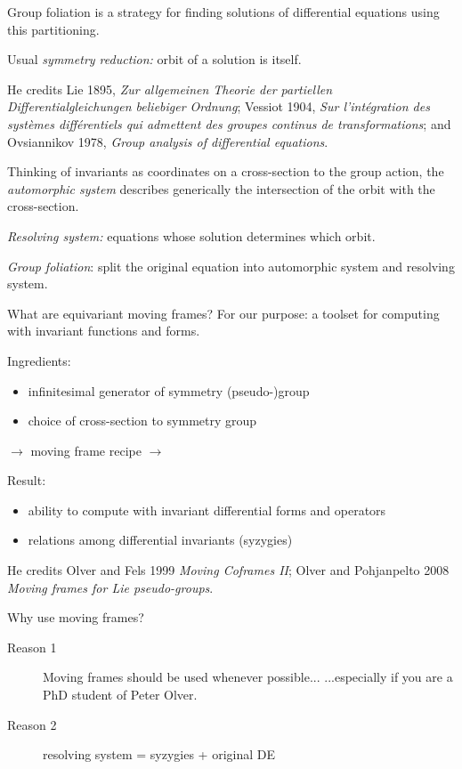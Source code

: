 \begin{description}
Group foliation is a strategy for finding solutions of differential
equations using this partitioning.

Usual \emph{symmetry reduction:} orbit of a solution is itself.

He credits
Lie 1895, \emph{Zur allgemeinen Theorie der partiellen
Differentialgleichungen beliebiger Ordnung};
Vessiot 1904, \emph{Sur l'int\'egration des syst\`emes diff\'erentiels qui
admettent des groupes continus de transformations};
 and Ovsiannikov 1978, \emph{Group analysis of differential equations}.


Thinking of invariants as coordinates on a cross-section to the
group action, the \emph{automorphic system} describes generically the
intersection of the orbit with the cross-section.

\emph{Resolving system:} equations whose solution determines which orbit.

\emph{Group foliation}: split the original equation into
automorphic system and resolving system.

What are equivariant moving frames?
For our purpose: a toolset for computing with invariant functions
and forms.

Ingredients:
  \begin{itemize}
    \item infinitesimal generator of symmetry (pseudo-)group
    \item choice of cross-section to symmetry group
  \end{itemize}

$\to$
moving frame recipe
$\to$

Result:
  \begin{itemize}
    \item ability to compute with invariant differential forms and operators
    \item relations among differential invariants (syzygies)
  \end{itemize}

He credits
Olver and Fels 1999 \emph{Moving Coframes II};
Olver and Pohjanpelto 2008 \emph{Moving frames for Lie pseudo-groups}.

Why use moving frames?
\begin{description}
  \item[Reason 1]
Moving frames should be used whenever possible... ...especially if you
are a PhD student of Peter Olver.
  \item[Reason 2]
resolving system = syzygies + original DE


\end{description}
\end{description}
